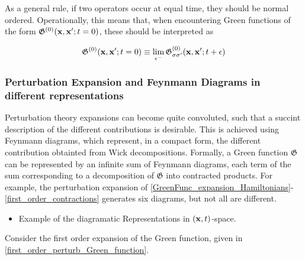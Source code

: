\documentclass{homework}
\begin{document}
As a general rule, if two operators occur at equal time, they should be normal ordered. Operationally, this means that, when encountering Green functions of the form $\mathfrak{G}^{(0)}({\bf x}, {\bf x}'; t = 0)$, these should be interpreted as 

\begin{equation}
    \mathfrak{G}^{(0)}({\bf x}, {\bf x}'; t = 0) \equiv \lim_{\epsilon^{-}} \mathfrak{G}_{\sigma \sigma'}^{(0)}({\bf x}, {\bf x}'; t + \epsilon)
\end{equation}

\subsubsection{Perturbation Expansion and Feynmann Diagrams in different representations}

Perturbation theory expansions can become quite convoluted, such that a succint description of the different contributions is desirable. This is achieved using Feynmann diagrams, which represent, in a compact form, the different contribution obtainted from Wick decompositions. Formally, a Green function $\mathfrak{G}$
can be represented by an infinite sum of Feynmann diagrams, each term of the sum corresponding to a decomposition of $\mathfrak{G}$ into contracted products. For example, the perturbation expansion of \cref{GreenFunc_expansion_Hamiltonians}-\cref{first_order_contractions} generates six diagrams, but not all are different. \\

\begin{itemize}
    \item Example of the diagramatic Representations in $({\bf x},t)$-space.
\end{itemize}

Consider the first order expansion of the Green function, given in \cref{first_order_perturb_Green_function}.
\end{document}
